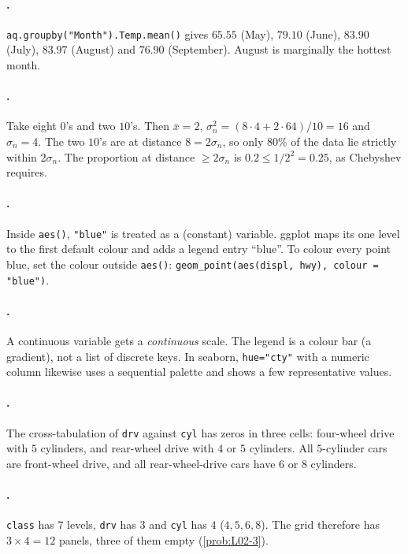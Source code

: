 \paragraph{.}
\texttt{aq.groupby("Month").Temp.mean()} gives $65.55$ (May), $79.10$ (June), $83.90$ (July),
$83.97$ (August) and $76.90$ (September). August is marginally the hottest month.

\paragraph{.}
Take eight $0$'s and two $10$'s. Then $\bar x=2$, $\sigma_n^2=(8\cdot 4+2\cdot 64)/10=16$ and
$\sigma_n=4$. The two $10$'s are at distance $8=2\sigma_n$, so only $80\%$ of the data lie strictly
within $2\sigma_n$. The proportion at distance $\ge 2\sigma_n$ is $0.2\le 1/2^2=0.25$, as
Chebyshev requires.

\paragraph{.}
Inside \texttt{aes()}, \texttt{"blue"} is treated as a (constant) variable. ggplot maps its one
level to the first default colour and adds a legend entry ``blue''. To colour every point blue,
set the colour outside \texttt{aes()}:
\texttt{geom\_point(aes(displ, hwy), colour = "blue")}.

\paragraph{.}
A continuous variable gets a \emph{continuous} scale. The legend is a colour bar (a gradient),
not a list of discrete keys. In seaborn, \texttt{hue="cty"} with a numeric column likewise uses a
sequential palette and shows a few representative values.

\paragraph{.}
The cross-tabulation of \texttt{drv} against \texttt{cyl} has zeros in three cells: four-wheel
drive with $5$ cylinders, and rear-wheel drive with $4$ or $5$ cylinders. All $5$-cylinder cars
are front-wheel drive, and all rear-wheel-drive cars have $6$ or $8$ cylinders.

\paragraph{.}
\texttt{class} has $7$ levels, \texttt{drv} has $3$ and \texttt{cyl} has $4$ ($4,5,6,8$). The grid
therefore has $3\times 4=12$ panels, three of them empty (\cref{prob:L02-3}).

